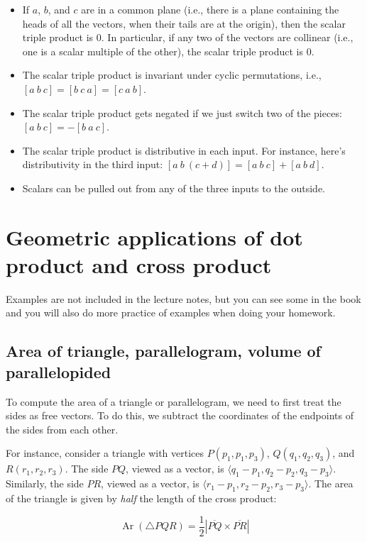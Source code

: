 \documentclass[10pt]{amsart}
\begin{document}
\begin{itemize}
\item If $a$, $b$, and $c$ are in a common plane (i.e., there is a
  plane containing the heads of all the vectors, when their tails are
  at the origin), then the scalar triple product is $0$. In
  particular, if any two of the vectors are collinear (i.e., one is a
  scalar multiple of the other), the scalar triple product is $0$.
\item The scalar triple product is invariant under cyclic
  permutations, i.e., $[a \ b \ c] = [b \ c \ a] = [c \ a \ b]$.
\item The scalar triple product gets negated if we just switch two of
  the pieces: $[a \ b \ c] = -[b \ a \ c]$.
\item The scalar triple product is distributive in each input. For
  instance, here's distributivity in the third input: $[a \ b \ (c +
  d)] = [a \ b \ c] + [a \ b \ d]$.
\item Scalars can be pulled out from any of the three inputs to the
  outside.
\end{itemize}

\section{Geometric applications of dot product and cross product}

Examples are not included in the lecture notes, but you can see some
in the book and you will also do more practice of examples when doing
your homework.
\subsection{Area of triangle, parallelogram, volume of parallelopided}

To compute the area of a triangle or parallelogram, we need to first
treat the sides as free vectors. To do this, we subtract the
coordinates of the endpoints of the sides from each other.

For instance, consider a triangle with vertices $P(p_1,p_1,p_3)$,
$Q(q_1,q_2,q_3)$, and $R(r_1,r_2,r_3)$. The side $PQ$, viewed as a
vector, is $\langle q_1 - p_1, q_2 - p_2, q_3 - p_3
\rangle$. Similarly, the side $PR$, viewed as a vector, is $\langle
r_1 - p_1, r_2 - p_2, r_3 - p_3 \rangle$. The area of the triangle is
given by {\em half} the length of the cross product:

$$\operatorname{Ar}(\triangle PQR) = \frac{1}{2} |\overline{PQ} \times \overline{PR}|$$
\end{document}
